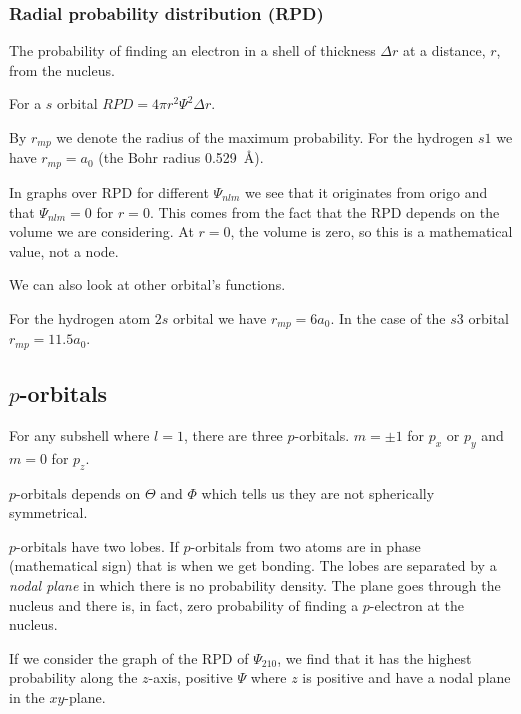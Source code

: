 \documentclass[../mit-general-chemistry.tex]{subfiles}
\begin{document}
\subsubsection{Radial probability distribution (RPD)}



\begin{definition}
  The probability of finding an electron in a shell of thickness
  $\Delta r$ at a distance, $r$, from the nucleus.

  For a $s$ orbital $RPD = 4\pi r^2 \Psi^2 \Delta r$.
\end{definition}

By $r_{mp}$ we denote the radius of the maximum probability. For the
hydrogen $s1$ we have $r_{mp} = a_0$ (the Bohr radius
\SI{0.529}{\angstrom}).

\begin{remark}
  In graphs over RPD for different $\Psi_{nlm}$ we see that it
  originates from origo and that $\Psi_{nlm} = 0$ for $r = 0$. This
  comes from the fact that the RPD depends on the volume we are
  considering. At $r = 0$, the volume is zero, so this is a
  mathematical value, not a node.
\end{remark}


We can also look at other orbital's functions.

For the hydrogen atom $2s$ orbital we have $r_{mp} = 6a_0$. In the
case of the $s3$ orbital $r_{mp} = 11.5a_0$.








\subsection{$p$-orbitals}


For any subshell where $l = 1$, there are three $p$-orbitals. $m = \pm
1$ for $p_x$ or $p_y$ and $m = 0$ for $p_z$.

$p$-orbitals depends on $\Theta$ and $\Phi$ which tells us they are
not spherically symmetrical.

$p$-orbitals have two lobes. If $p$-orbitals from two atoms are in
phase (mathematical sign) that is when we get bonding. The lobes are
separated by a {\em nodal plane} in which there is no probability
density. The plane goes through the nucleus and there is, in fact,
zero probability of finding a $p$-electron at the nucleus.

If we consider the graph of the RPD of $\Psi_{210}$, we find that it
has the highest probability along the $z$-axis, positive $\Psi$ where
$z$ is positive and have a nodal plane in the $xy$-plane.
\end{document}
